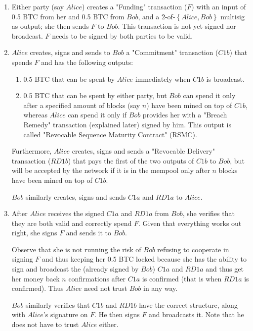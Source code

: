    \begin{enumerate}
      \item Either party (say $Alice$) creates a "Funding" transaction ($F$) with an input
      of 0.5 BTC from her and 0.5 BTC from $Bob$, and a 2-of-$\left\{Alice, Bob\right\}$
      multisig as output; she then sends $F$ to $Bob$. This transaction is not yet signed
      nor broadcast. $F$ needs to be signed by both parties to be valid.

      \item $Alice$ creates, signs and sends to $Bob$ a "Commitment" transaction ($C1b$)
      that spends $F$ and has the following outputs:
      \begin{enumerate}
        \item 0.5 BTC that can be spent by $Alice$ immediately when $C1b$ is broadcast.
        \item 0.5 BTC that can be spent by either party, but $Bob$ can spend it only after
        a specified amount of blocks (say $n$) have been mined on top of $C1b$, whereas
        $Alice$ can spend it only if $Bob$ provides her with a "Breach Remedy" transaction
        (explained later) signed by him. This output is called "Revocable Sequence
        Maturity Contract" (RSMC).
      \end{enumerate}
      Furthermore, $Alice$ creates, signs and sends a "Revocable Delivery" transaction
      ($RD1b$) that pays the first of the two outputs of $C1b$ to $Bob$, but will be
      accepted by the network if it is in the mempool only after $n$ blocks have been
      mined on top of $C1b$.

      $Bob$ similarly creates, signs and sends $C1a$ and $RD1a$ to $Alice$.

      \item After $Alice$ receives the signed $C1a$ and $RD1a$ from $Bob$, she verifies
      that they are both valid and correctly spend $F$. Given that everything works out
      right, she signs $F$ and sends it to $Bob$.

      Observe that she is not running the risk of $Bob$ refusing to cooperate in signing
      $F$ and thus keeping her 0.5 BTC locked because she has the ability to sign and
      broadcast the (already signed by $Bob$) $C1a$ and $RD1a$ and thus get her money back
      $n$ confirmations after $C1a$ is confirmed (that is when $RD1a$ is confirmed). Thus
      $Alice$ need not trust $Bob$ in any way.

      $Bob$ similarly verifies that $C1b$ and $RD1b$ have the correct structure, along
      with $Alice$'s signature on $F$. He then signs $F$ and broadcasts it. Note that he
      does not have to trust $Alice$ either.
    \end{enumerate}

